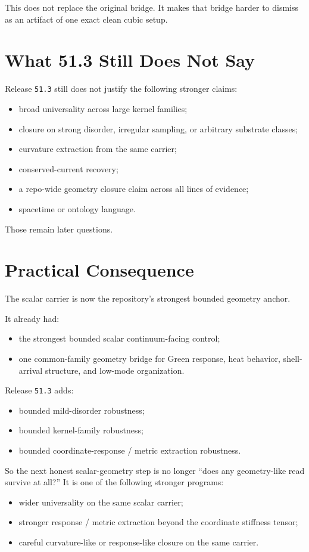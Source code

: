 \documentclass[11pt]{article}
\begin{document}
This does not replace the original bridge. It makes that bridge harder to dismiss as an artifact of one exact clean cubic setup.

\section{What 51.3 Still Does Not Say}

Release \texttt{51.3} still does not justify the following stronger claims:
\begin{itemize}
\item broad universality across large kernel families;
\item closure on strong disorder, irregular sampling, or arbitrary substrate classes;
\item curvature extraction from the same carrier;
\item conserved-current recovery;
\item a repo-wide geometry closure claim across all lines of evidence;
\item spacetime or ontology language.
\end{itemize}

Those remain later questions.

\section{Practical Consequence}

The scalar carrier is now the repository's strongest bounded geometry anchor.

It already had:
\begin{itemize}
\item the strongest bounded scalar continuum-facing control;
\item one common-family geometry bridge for Green response, heat behavior, shell-arrival structure, and low-mode organization.
\end{itemize}

Release \texttt{51.3} adds:
\begin{itemize}
\item bounded mild-disorder robustness;
\item bounded kernel-family robustness;
\item bounded coordinate-response / metric extraction robustness.
\end{itemize}

So the next honest scalar-geometry step is no longer ``does any geometry-like read survive at all?'' It is one of the following stronger programs:
\begin{itemize}
\item wider universality on the same scalar carrier;
\item stronger response / metric extraction beyond the coordinate stiffness tensor;
\item careful curvature-like or response-like closure on the same carrier.
\end{itemize}
\end{document}
